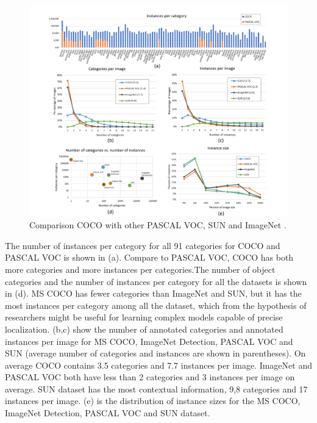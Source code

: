 \documentclass[
]{krantz}
\begin{document}
\begin{figure}

{\centering \includegraphics[width=1\linewidth]{figures/02-01/2.1 coco comparison} 

}

\caption{Comparison COCO with other PASCAL VOC, SUN and ImageNet \citep{mccoco}.}\label{fig:cococomparison}
\end{figure}

The number of instances per category for all 91 categories for COCO and PASCAL VOC is shown in (a). Compare to PASCAL VOC, COCO has both more categories and more instances per categories.The number of object categories and the number of instances per category for all the datasets is shown in (d). MS COCO has fewer categories than ImageNet and SUN, but it has the most instances per category among all the dataset, which from the hypothesis of researchers might be useful for learning complex models capable of precise localization.\citep{mccoco}
(b,c) show the number of annotated categories and annotated instances per image for MS COCO, ImageNet Detection, PASCAL VOC and SUN (average number of categories and instances are shown in parentheses). On average COCO contains 3.5 categories and 7.7 instances per image. ImageNet and PASCAL VOC both have less than 2 categories and 3 instances per image on average. SUN dataset has the most contextual information, 9,8 categories and 17 instances per image.
(e) is the distribution of instance sizes for the MS COCO, ImageNet Detection, PASCAL VOC and SUN dataset.\citep{mccoco}
\end{document}
